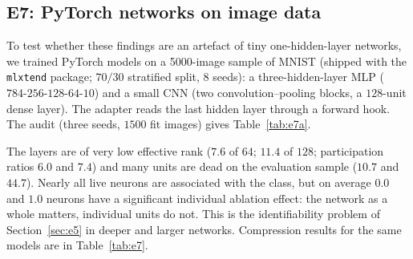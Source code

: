 \documentclass[11pt,a4paper]{article}
\theoremstyle{remark}\newtheorem{remark}{Remark}
\begin{document}
\subsection{E7: PyTorch networks on image data}\label{sec:e7}
To test whether these findings are an artefact of tiny one-hidden-layer networks, we trained PyTorch models on a 5000-image sample of MNIST (shipped with the \texttt{mlxtend} package; $70/30$ stratified split, 8 seeds): a three-hidden-layer MLP ($784\text{-}256\text{-}128\text{-}64\text{-}10$) and a small CNN (two convolution--pooling blocks, a $128$-unit dense layer). The adapter reads the last hidden layer through a forward hook. The audit (three seeds, $1500$ fit images) gives Table~\ref{tab:e7a}.
\begin{table}[ht]\centering\small
\caption{Audit of PyTorch models (mean over 3 seeds); ``dead'' means constant on the evaluation sample.}\label{tab:e7a}

\end{table}
The layers are of very low effective rank ($7.6$ of $64$; $11.4$ of $128$; participation ratios $6.0$ and $7.4$) and many units are dead on the evaluation sample ($10.7$ and $44.7$). Nearly all live neurons are associated with the class, but on average $0.0$ and $1.0$ neurons have a significant individual ablation effect: the network as a whole matters, individual units do not. This is the identifiability problem of Section~\ref{sec:e5} in deeper and larger networks. Compression results for the same models are in Table~\ref{tab:e7}.
\end{document}
